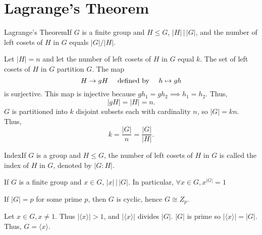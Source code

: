 \documentclass{report}
\newcommand{\thm}[2]{\begin{Theorem}{#1}{}#2\end{Theorem}}
\newcommand{\cor}[2]{\begin{Corollary}{#1}{}#2\end{Corollary}}
\newcommand{\dfn}[2]{\begin{Definition}[colbacktitle=red!75!black]{#1}{}#2\end{Definition}}
\newenvironment{myproof}[1][\proofname]{%
	\proof[\bfseries #1: ]%
}{\endproof}
\begin{document}
\section{Lagrange's Theorem}
\thm{Lagrange's Theorem}{If $G$ is a finite group and $H \leq G$, $|H|\hspace{2pt} \big| \hspace{2pt} |G|$, and the number of left cosets of $H$ in $G$ equals $|G| / |H|$.}
\begin{myproof}
    Let $|H| = n$ and let the number of left cosets of $H$ in $G$ equal $k$. The set of left cosets of $H$ in $G$ partition $G$. The map 
    $$H \to gH \text{\hspace{10pt} defined by \hspace{10pt}} h \mapsto gh$$
    is surjective. This map is injective because $gh_1 = gh_2 \implies h_1 = h_2$. Thus, 
    $$|gH| = |H| = n.$$
    $G$ is partitioned into $k$ disjoint subsets each with cardinality $n$, so $|G| = kn$. Thus, 
    $$k = \frac{|G|}{n} = \frac{|G|}{|H|}.$$
\end{myproof}
\dfn{Index}{If $G$ is a group and $H \leq G$, the number of left cosets of $H$ in $G$ is called the index of $H$ in $G$, denoted by $|G: H|$.}

\cor{}{If $G$ is a finite group and $x \in G$, $|x|\hspace{2pt} \big| \hspace{2pt} |G|$. In particular, $\forall x \in G, x^{|G|} = 1$}
\cor{}{If $|G| = p$ for some prime $p$, then $G$ is cyclic, hence $G \cong Z_p$.}
\begin{myproof}
    Let $x \in G, x \neq 1$. Thus $| \langle x \rangle | > 1$, and $| \langle x \rangle |$ divides $|G|$. $|G|$ is prime so $|\langle x \rangle | = |G|$. Thus, $G = \langle x \rangle$.
\end{myproof}

\end{document}
